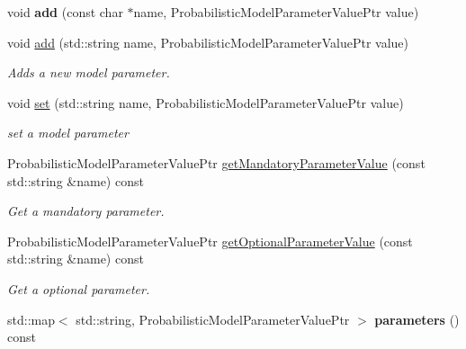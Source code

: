 \begin{DoxyCompactItemize}
\item 
\mbox{\label{classtops_1_1ProbabilisticModelParameters_a866f6fb9047828914b297e71fadfe798}} 
void {\bfseries add} (const char $\ast$name, Probabilistic\+Model\+Parameter\+Value\+Ptr value)
\item 
\mbox{\label{classtops_1_1ProbabilisticModelParameters_a6da7fcd72e39b13042a581cc40871139}} 
void \hyperlink{classtops_1_1ProbabilisticModelParameters_a6da7fcd72e39b13042a581cc40871139}{add} (std\+::string name, Probabilistic\+Model\+Parameter\+Value\+Ptr value)
\begin{DoxyCompactList}\small\item\em Adds a new model parameter. \end{DoxyCompactList}\item 
\mbox{\label{classtops_1_1ProbabilisticModelParameters_ac86325e25ce375f94a31d6209075d298}} 
void \hyperlink{classtops_1_1ProbabilisticModelParameters_ac86325e25ce375f94a31d6209075d298}{set} (std\+::string name, Probabilistic\+Model\+Parameter\+Value\+Ptr value)
\begin{DoxyCompactList}\small\item\em set a model parameter \end{DoxyCompactList}\item 
\mbox{\label{classtops_1_1ProbabilisticModelParameters_ae0774fb06eb00f25d2fa335d6ca2fb9b}} 
Probabilistic\+Model\+Parameter\+Value\+Ptr \hyperlink{classtops_1_1ProbabilisticModelParameters_ae0774fb06eb00f25d2fa335d6ca2fb9b}{get\+Mandatory\+Parameter\+Value} (const std\+::string \&name) const
\begin{DoxyCompactList}\small\item\em Get a mandatory parameter. \end{DoxyCompactList}\item 
\mbox{\label{classtops_1_1ProbabilisticModelParameters_a0ceb1eef0aa704232687af637973534f}} 
Probabilistic\+Model\+Parameter\+Value\+Ptr \hyperlink{classtops_1_1ProbabilisticModelParameters_a0ceb1eef0aa704232687af637973534f}{get\+Optional\+Parameter\+Value} (const std\+::string \&name) const
\begin{DoxyCompactList}\small\item\em Get a optional parameter. \end{DoxyCompactList}\item 
\mbox{\label{classtops_1_1ProbabilisticModelParameters_a91b99897da0a4b66299ba882fc9c8e93}} 
std\+::map$<$ std\+::string, Probabilistic\+Model\+Parameter\+Value\+Ptr $>$ {\bfseries parameters} () const
\end{DoxyCompactItemize}


